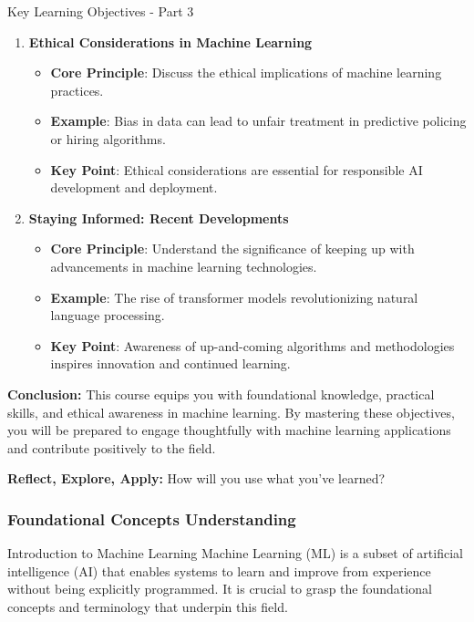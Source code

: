 \documentclass[aspectratio=169]{beamer}
\begin{document}
\begin{frame}[fragile]{Key Learning Objectives - Part 3}
    \begin{enumerate}[resume]
        \item \textbf{Ethical Considerations in Machine Learning}
        \begin{itemize}
            \item \textbf{Core Principle}: Discuss the ethical implications of machine learning practices.
            \item \textbf{Example}: Bias in data can lead to unfair treatment in predictive policing or hiring algorithms.
            \item \textbf{Key Point}: Ethical considerations are essential for responsible AI development and deployment.
        \end{itemize}
        
        \item \textbf{Staying Informed: Recent Developments}
        \begin{itemize}
            \item \textbf{Core Principle}: Understand the significance of keeping up with advancements in machine learning technologies.
            \item \textbf{Example}: The rise of transformer models revolutionizing natural language processing.
            \item \textbf{Key Point}: Awareness of up-and-coming algorithms and methodologies inspires innovation and continued learning.
        \end{itemize}
    \end{enumerate}

    \textbf{Conclusion:} This course equips you with foundational knowledge, practical skills, and ethical awareness in machine learning. By mastering these objectives, you will be prepared to engage thoughtfully with machine learning applications and contribute positively to the field. 
    
    \textbf{Reflect, Explore, Apply:} How will you use what you’ve learned?
\end{frame}

\begin{frame}[fragile]
    \frametitle{Foundational Concepts Understanding}
    \begin{block}{Introduction to Machine Learning}
        Machine Learning (ML) is a subset of artificial intelligence (AI) that enables systems to learn and improve from experience without being explicitly programmed.
        It is crucial to grasp the foundational concepts and terminology that underpin this field.
    \end{block}
\end{frame}
\end{document}
